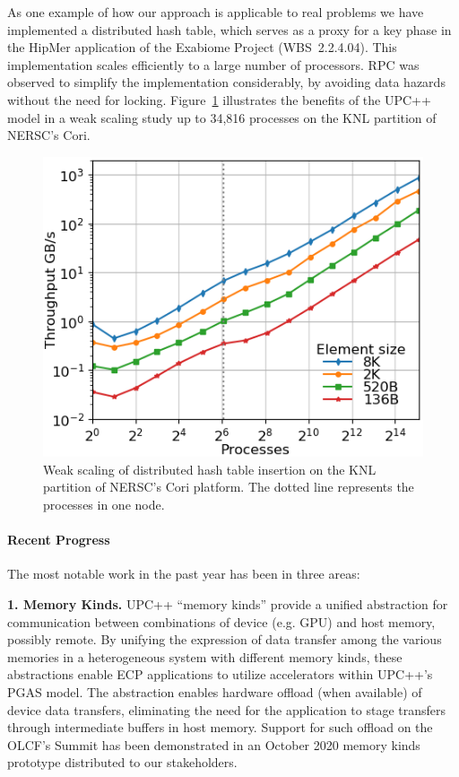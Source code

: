 As one example of how our approach is applicable to real problems
we have implemented a distributed hash table, which serves as a proxy
for a key phase in the HipMer application of the Exabiome Project (WBS~2.2.4.04).
This implementation scales efficiently
to a large number of processors. RPC was observed to simplify the implementation
considerably, by avoiding data hazards without the need for locking.
Figure~\ref{fig:dht} illustrates the benefits of the UPC++ model 
in a weak scaling study up to 34,816 processes on the KNL partition of NERSC's Cori.


\begin{figure}[htb]
\centering
      \includegraphics[scale=0.70]{projects/2.3.1-PMR/2.3.1.14-UPCxx-GASNet/all-cori-knl-out-inserts-wait.png}
  \caption{Weak scaling of distributed hash table insertion on the KNL partition of NERSC's Cori platform. The dotted line represents the processes in one node.}
  \label{fig:dht}
\end{figure}



\paragraph{Recent Progress}

The most notable work in the past year has been in three areas:

\textbf{1. Memory Kinds.}
UPC++ ``memory kinds'' provide a unified abstraction for communication between
combinations of device (e.g. GPU) and host memory, possibly remote.  By
unifying the expression of data transfer among the various memories in a
heterogeneous system with different memory kinds, these abstractions enable ECP
applications to utilize accelerators within UPC++'s PGAS model.  The
abstraction enables hardware offload (when available) of device data transfers,
eliminating the need for the application to stage transfers through
intermediate buffers in host memory.  Support for such offload on the OLCF's
Summit has been demonstrated in an October 2020 memory kinds prototype
distributed to our stakeholders.

